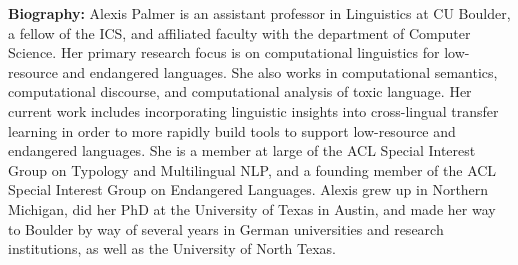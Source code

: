 {\bfseries Biography:}
Alexis Palmer is an assistant professor in Linguistics at CU Boulder, a fellow of the ICS, and affiliated faculty with the department of Computer Science. Her primary research focus is on computational linguistics for low-resource and endangered languages. She also works in computational semantics, computational discourse, and computational analysis of toxic language. Her current work includes incorporating linguistic insights into cross-lingual transfer learning in order to more rapidly build tools to support low-resource and endangered languages. She is a member at large of the ACL Special Interest Group on Typology and Multilingual NLP, and a founding member of the ACL Special Interest Group on Endangered Languages. Alexis grew up in Northern Michigan, did her PhD at the University of Texas in Austin, and made her way to Boulder by way of several years in German universities and research institutions, as well as the University of North Texas.

\newpage
